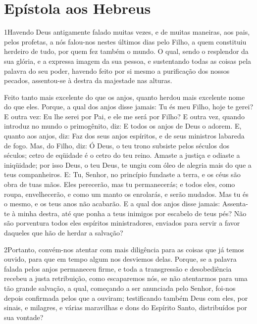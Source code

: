 \thispagestyle{empty}
\chapter*{Epístola aos Hebreus}

\lettrine{1} Havendo Deus antigamente falado muitas vezes, e
de muitas maneiras, aos pais, pelos profetas, a nós falou-nos nestes
últimos dias pelo Filho, a quem constituiu herdeiro de tudo, por
quem fez também o mundo. O qual, sendo o resplendor da sua
glória, e a expressa imagem da sua pessoa, e sustentando todas as
coisas pela palavra do seu poder, havendo feito por si mesmo a
purificação dos nossos pecados, assentou-se à destra da majestade
nas alturas.

Feito tanto mais excelente do que os anjos, quanto herdou mais
excelente nome do que eles. Porque, a qual dos anjos disse
jamais: Tu és meu Filho, hoje te gerei? E outra vez: Eu lhe serei
por Pai, e ele me será por Filho? E outra vez, quando introduz
no mundo o primogênito, diz: E todos os anjos de Deus o adorem.
E, quanto aos anjos, diz: Faz dos seus anjos espíritos, e de
seus ministros labareda de fogo. Mas, do Filho, diz: Ó Deus, o
teu trono subsiste pelos séculos dos séculos; cetro de eqüidade é o
cetro do teu reino. Amaste a justiça e odiaste a iniqüidade; por
isso Deus, o teu Deus, te ungiu com óleo de alegria mais do que a
teus companheiros. E: Tu, Senhor, no princípio fundaste a
terra, e os céus são obra de tuas mãos. Eles perecerão, mas
tu permanecerás; e todos eles, como roupa, envelhecerão, e
como um manto os enrolarás, e serão mudados. Mas tu és o mesmo, e os
teus anos não acabarão. E a qual dos anjos disse jamais:
Assenta-te à minha destra, até que ponha a teus inimigos por
escabelo de teus pés? Não são porventura todos eles espíritos
ministradores, enviados para servir a favor daqueles que hão de
herdar a salvação?

\medskip

\lettrine{2} Portanto, convém-nos atentar com mais diligência
para as coisas que já temos ouvido, para que em tempo algum nos
desviemos delas. Porque, se a palavra falada pelos anjos
permaneceu firme, e toda a transgressão e desobediência recebeu a
justa retribuição, como escaparemos nós, se não atentarmos para
uma tão grande salvação, a qual, começando a ser anunciada pelo
Senhor, foi-nos depois confirmada pelos que a ouviram;
testificando também Deus com eles, por sinais, e milagres, e
várias maravilhas e dons do Espírito Santo, distribuídos por sua
vontade?

